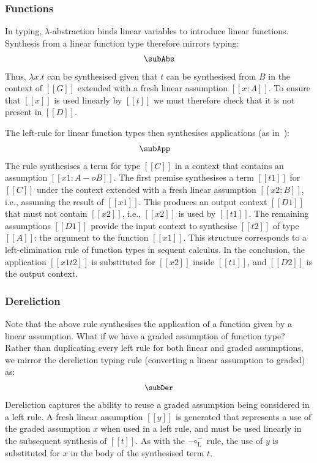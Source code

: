   \subsubsection{Functions}
In typing, $\lambda$-abstraction binds linear variables to introduce
  linear functions. Synthesis from a linear function type therefore mirrors typing:
%
  \begin{align*}
\subAbs
    \end{align*}
%
  Thus, $\lambda x . t$ can be synthesised given that
  $t$ can be synthesised from $B$ in the context of $[[G]]$ extended with a fresh linear assumption $[[ x
  : A]]$. To ensure that $[[x]]$ is used linearly
  by $[[t]]$ we must therefore check that it is not present in
  $[[D]]$.

The left-rule for linear function types then synthesises applications
(as in~\cite{HODAS1994327}):
%
  \begin{align*}
    \hspace{-1em}\subApp
    \end{align*}
%
  The rule synthesises a term for type $[[ C ]]$ in a context that
  contains an assumption $[[ x1 : A -o B ]]$.
%
  The first premise synthesises a term $[[t1]]$ for $[[C]]$ under the context
  extended with a fresh linear assumption $[[x2 : B]]$, i.e., assuming the
  result of $[[ x1 ]]$. This produces an output context $[[D1]]$ that must not
  contain $[[x2]]$, i.e., $[[x2]]$ is used by $[[t1]]$. The remaining
  assumptions $[[D1]]$ provide the input context to synthesise $[[t2]]$ of type
  $[[A]]$: the argument to the function $[[x1]]$. This structure corresponds to a
  left-elimination rule of function types in sequent calculus. In the
  conclusion, the application $[[x1 t2]]$ is substituted for $[[x2]]$ inside
  $[[t1]]$, and $[[D2]]$ is the output context.

\subsubsection{Dereliction} Note that the above rule synthesises the application of a
function given by a linear assumption. What if we have a graded
assumption of function type? Rather than duplicating every left rule
for both linear and graded assumptions, we mirror the
dereliction typing rule (converting a linear assumption to graded) as:
%
  \begin{gather*}
    {\small{
    \subDer
    }}
    \end{gather*}
%
Dereliction captures the ability to reuse a graded assumption being considered
in a left rule. A fresh linear assumption $[[y]]$ is generated that represents a
use of the graded assumption $x$ when used in a left rule, and must be used
linearly in the subsequent synthesis of $[[t]]$. As with the
$\multimap^{-}_{\textsc{L}}$ rule, the use of $y$ is substituted for $x$ in the
body of the synthesised term $t$. 

